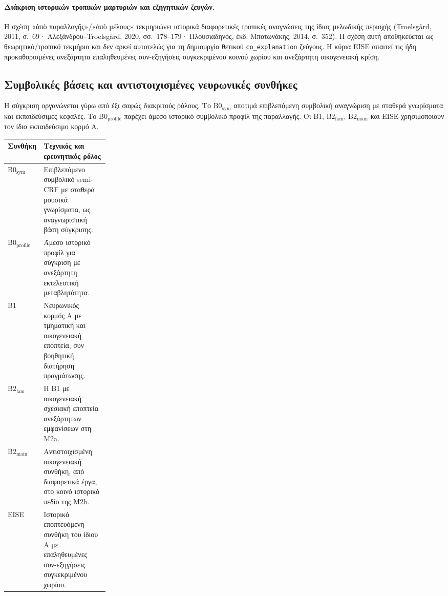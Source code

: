 \documentclass[11pt,a4paper]{article}
\begin{document}
\paragraph{Διάκριση ιστορικών τροπικών μαρτυριών και εξηγητικών ζευγών.} Η σχέση «ἀπὸ παραλλαγῆς»/«ἀπὸ μέλους» τεκμηριώνει ιστορικά διαφορετικές τροπικές αναγνώσεις της ίδιας μελωδικής περιοχής (Troelsgård, 2011, σ.~69· Αλεξάνδρου--Troelsgård, 2020, σσ.~178--179· Πλουσιαδηνός, έκδ. Μποτωνάκης, 2014, σ.~352). Η σχέση αυτή αποθηκεύεται ως θεωρητικό/τροπικό τεκμήριο και δεν αρκεί αυτοτελώς για τη δημιουργία θετικού \texttt{co\_explanation} ζεύγους. Η κύρια EISE απαιτεί τις ήδη προκαθορισμένες ανεξάρτητα επαληθευμένες συν-εξηγήσεις συγκεκριμένου κοινού χωρίου και ανεξάρτητη οικογενειακή κρίση.

\subsection{Συμβολικές βάσεις και αντιστοιχισμένες νευρωνικές συνθήκες}

Η σύγκριση οργανώνεται γύρω από έξι σαφώς διακριτούς ρόλους. Το $\mathrm{B0}_{\mathrm{sym}}$ αποτιμά επιβλεπόμενη συμβολική αναγνώριση με σταθερά γνωρίσματα και εκπαιδεύσιμες κεφαλές. Το $\mathrm{B0}_{\mathrm{profile}}$ παρέχει άμεσο ιστορικό συμβολικό προφίλ της παραλλαγής. Οι B1, $\mathrm{B2}_{\mathrm{fam}}$, $\mathrm{B2}_{\mathrm{main}}$ και EISE χρησιμοποιούν τον ίδιο εκπαιδεύσιμο κορμό A.

{\small\begin{xltabular}{\linewidth}{@{}p{0.23\linewidth}Y@{}}
\toprule
\textbf{Συνθήκη} & \textbf{Τεχνικός και ερευνητικός ρόλος}\\\midrule
$\mathrm{B0}_{\mathrm{sym}}$ & Επιβλεπόμενο συμβολικό semi-CRF με σταθερά μουσικά γνωρίσματα, ως αναγνωριστική βάση σύγκρισης.\\\midrule
$\mathrm{B0}_{\mathrm{profile}}$ & Άμεσο ιστορικό προφίλ για σύγκριση με ανεξάρτητη εκτελεστική μεταβλητότητα.\\\midrule
B1 & Νευρωνικός κορμός A με τμηματική και οικογενειακή εποπτεία, συν βοηθητική διατήρηση πραγμάτωσης.\\\midrule
$\mathrm{B2}_{\mathrm{fam}}$ & Η B1 με οικογενειακή σχεσιακή εποπτεία ανεξάρτητων εμφανίσεων στη Μ2a.\\\midrule
$\mathrm{B2}_{\mathrm{main}}$ & Αντιστοιχισμένη οικογενειακή συνθήκη, από διαφορετικά έργα, στο κοινό ιστορικό πεδίο της Μ2b.\\\midrule
EISE & Ιστορικά εποπτευόμενη συνθήκη του ίδιου A με επαληθευμένες συν-εξηγήσεις συγκεκριμένου χωρίου.\\\bottomrule
\end{xltabular}}\par
\end{document}
